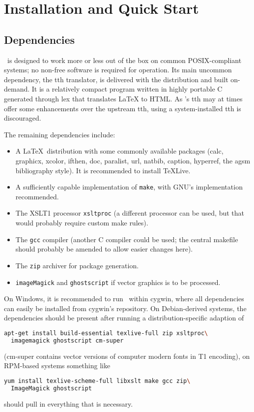 \documentclass[11pt,a4paper]{ivoa}
\begin{document}
\section{Installation and Quick Start}
\label{sect:quick}

\subsection{Dependencies}

\ivoatex\ is designed to work more or less out of the box on common
POSIX-compliant systems; no non-free software is required for operation.
Its main uncommon dependency, the tth translator, is delivered with the
distribution and built on-demand. It is a relatively compact program
written in highly portable C generated through lex that translates LaTeX
to HTML.
As \ivoatex's tth may at times offer
some enhancements over the upstream tth, using a system-installed tth is
discouraged.

The remaining dependencies include:

\begin{itemize}
\item A \LaTeX\ distribution with some commonly available packages (calc,
graphicx, xcolor, ifthen, doc, paralist, url, natbib, caption, hyperref,
the agsm bibliography style).  It is recommended to install TeXLive.
\item A sufficiently capable implementation of \texttt{make}, with GNU's
implementation recommended.
\item The XSLT1 processor \texttt{xsltproc} (a different processor can
be used, but that would probably require custom make rules).
\item The \texttt{gcc} compiler (another C compiler could be used; the
central makefile should probably be amended to allow easier changes
here).
\item The \texttt{zip} archiver for package generation.
\item \texttt{imageMagick} and \texttt{ghostscript} if vector graphics
is to be processed.
\end{itemize}

On Windows, it is recommended to run \ivoatex\ within cygwin, where all
dependencies can easily be installed from cygwin's repository.  On
Debian-derived systems, the dependencies should be present after
running a distribution-specific adaption of
\begin{lstlisting}[language=sh]
apt-get install build-essential texlive-full zip xsltproc\
  imagemagick ghostscript cm-super
\end{lstlisting}
(cm-super contains vector versions of computer modern fonts in T1
encoding), on RPM-based systems something like
\begin{lstlisting}[language=sh]
yum install texlive-scheme-full libxslt make gcc zip\
  ImageMagick ghostscript
\end{lstlisting}
should pull in everything that is necessary.
\end{document}
